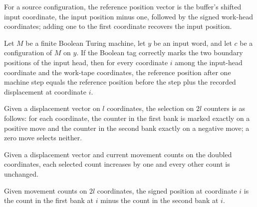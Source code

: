 \begin{definition}
\label{Complexity.clPositions}
\leanok
{}
For a source configuration, the reference position vector is the buffer's shifted input coordinate, the input position minus one, followed by the signed work-head coordinates; adding one to the first coordinate recovers the input position.
\end{definition}

\begin{lemma}
\label{Complexity.clMoves_correct}
\leanok
{}
Let $M$ be a finite Boolean Turing machine, let $y$ be an input word, and let $c$ be a
configuration of $M$ on $y$. If the Boolean tag correctly marks the two boundary
positions of the input head, then for every coordinate $i$ among the input-head
coordinate and the work-tape coordinates, the reference position after one machine step
equals the reference position before the step plus the recorded displacement at
coordinate $i$.
\end{lemma}

\begin{definition}
\label{Complexity.clSelect}
\leanok
Given a displacement vector on $l$ coordinates, the selection on $2l$ counters is as follows: for each coordinate, the counter in the first bank is marked exactly on a positive move and the counter in the second bank exactly on a negative move; a zero move selects neither.
\end{definition}

\begin{definition}
\label{Complexity.clAdvance}
\leanok
{}
Given a displacement vector and current movement counts on the doubled coordinates, each selected count increases by one and every other count is unchanged.
\end{definition}

\begin{definition}
\label{Complexity.clSigned}
\leanok
Given movement counts on $2l$ coordinates, the signed position at coordinate $i$ is the count in the first bank at $i$ minus the count in the second bank at $i$.
\end{definition}

